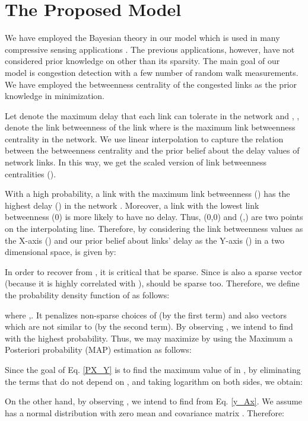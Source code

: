 \documentclass{article}
\begin{document}
\section{The Proposed Model}
\label{The Proposed Model}
We have employed the Bayesian theory in our model which is used in many compressive sensing applications \cite{Bayesian1} \cite{Bayesian2} \cite{Bayesian3}. The previous applications, however, have not considered prior knowledge on  other than its sparsity. The main goal of our model is congestion detection with a few number of random walk measurements. We have employed the betweenness centrality \cite{BetweenC} of the congested links as the prior knowledge in  minimization. 

Let  denote the maximum delay that each link can tolerate in the network and , , denote the link betweenness of the link  where  is the maximum link betweenness centrality in the network. We use linear interpolation to capture the relation between the betweenness centrality and the prior belief about the delay values of network links. In this way, we get the scaled version of link betweenness centralities (). 

With a high probability, a link with the maximum link betweenness () has the highest delay () in the network \cite{CongBetween}. Moreover, a link with the lowest link betweenness (0) is more likely to have no delay. Thus, (0,0) and (,) are two points on the interpolating line. Therefore, by considering the link betweenness values as the X-axis () and our prior belief about links' delay as the Y-axis () in a two dimensional space,  is given by: 

In order to recover  from , it is critical that  be sparse. Since  is also a sparse vector (because it is highly correlated with ),  should be sparse too. Therefore, we define the probability density function of  as follows:

where ,. It penalizes non-sparse choices of  (by the first term) and also vectors  which are not similar to  (by the second term).
By observing , we intend to find  with the highest probability. Thus, we may maximize  by using the Maximum a Posteriori probability (MAP) estimation as follows:

Since the goal of Eq. \eqref{PX_Y} is to find the maximum value of  in , by eliminating the terms that do not depend on , and taking logarithm on both sides, we obtain:

On the other hand, by observing , we intend to find  from Eq. \eqref{y_Ax}. We assume  has a normal distribution with zero mean and covariance matrix . Therefore:   
\end{document}
